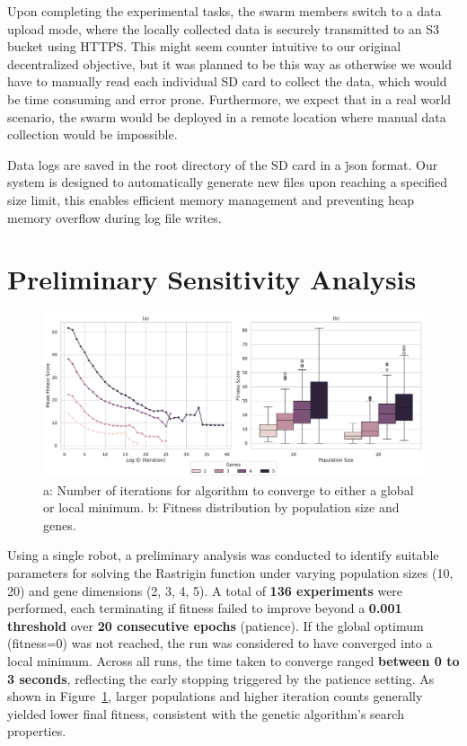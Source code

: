 \documentclass[conference]{IEEEtran}
\begin{document}
Upon completing the experimental tasks, the swarm members switch to a data upload mode, where the locally collected data is securely transmitted to an S3 bucket using HTTPS. This might seem counter intuitive to our original decentralized objective, but it was planned to be this way as otherwise we would have to manually read each individual SD card to collect the data, which would be time consuming and error prone. Furthermore, we expect that in a real world scenario, the swarm would be deployed in a remote location where manual data collection would be impossible.

Data logs are saved in the root directory of the SD card in a \.json format. Our system is designed to automatically generate new files upon reaching a specified size limit, this enables efficient memory management and preventing heap memory overflow during log file writes.


\newpage
\section{Preliminary Sensitivity Analysis}

\begin{figure}[h]
    \centering
    \includegraphics[width=1\textwidth]{ga_prelim_analysis.pdf}
    \caption{a: Number of iterations for algorithm to converge to either a global or local minimum. b: Fitness distribution by population size and genes.}
    \label{fig:ga_prelim_analysis}
\end{figure}

Using a single robot, a preliminary analysis was conducted to identify suitable parameters for solving the Rastrigin function under varying population sizes (10, 20) and gene dimensions (2, 3, 4, 5). A total of \textbf{136 experiments} were performed, each terminating if fitness failed to improve beyond a \textbf{0.001 threshold} over \textbf{20 consecutive epochs} (patience). %
If the global optimum (fitness=0) was not reached, the run was considered to have converged into a local minimum. Across all runs, the time taken to converge ranged \textbf{between 0 to 3 seconds}, reflecting the early stopping triggered by the patience setting. As shown in Figure~\ref{fig:ga_prelim_analysis}, larger populations and higher iteration counts generally yielded lower final fitness, consistent with the genetic algorithm’s search properties.\\
\end{document}
